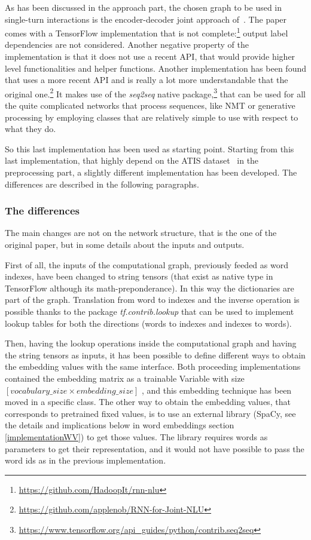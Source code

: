 As has been discussed in the approach part, the chosen graph to be used in single-turn interactions is the encoder-decoder joint approach of~\cite{liu2016attention}. The paper comes with a TensorFlow implementation that is not complete:\footnote{\url{https://github.com/HadoopIt/rnn-nlu}} output label dependencies are not considered. Another negative property of the implementation is that it does not use a recent API, that would provide higher level functionalities and helper functions. Another implementation has been found that uses a more recent API and is really a lot more understandable that the original one.\footnote{\url{https://github.com/applenob/RNN-for-Joint-NLU}} It makes use of the \textit{seq2seq} native package,\footnote{\url{https://www.tensorflow.org/api\_guides/python/contrib.seq2seq}} that can be used for all the quite complicated networks that process sequences, like NMT or generative processing by employing classes that are relatively simple to use with respect to what they do.

So this last implementation has been used as starting point. Starting from this last implementation, that highly depend on the ATIS dataset~\cite{hemphill1990atis} in the preprocessing part, a slightly different implementation has been developed. The differences are described in the following paragraphs.

\subsubsection{The differences}
The main changes are not on the network structure, that is the one of the original paper, but in some details about the inputs and outputs.

First of all, the inputs of the computational graph, previously feeded as word indexes, have been changed to string tensors (that exist as native type in TensorFlow although its math-preponderance). In this way the dictionaries are part of the graph. Translation from word to indexes and the inverse operation is possible thanks to the package \textit{tf.contrib.lookup} that can be used to implement lookup tables for both the directions (words to indexes and indexes to words).

Then, having the lookup operations inside the computational graph and having the string tensors as inputs, it has been possible to define different ways to obtain the embedding values with the same interface. Both proceeding implementations contained the embedding matrix as a trainable Variable with size  \(  \left[ vocabulary \_ size  \times  embedding \_ size \right]  \) , and this embedding technique has been moved in a specific class. The other way to obtain the embedding values, that corresponds to pretrained fixed values, is to use an external library (SpaCy, see the details and implications below in word embeddings section \ref{implementationWV}) to get those values. The library requires words as parameters to get their representation, and it would not have possible to pass the word ids as in the previous implementation.

